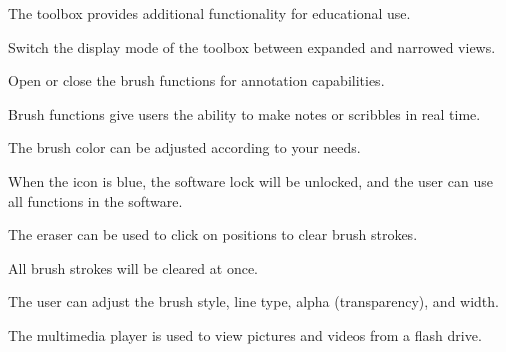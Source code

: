 \documentclass[11pt,a4paper]{article}
\begin{document}

The toolbox provides additional functionality for educational use.


Switch the display mode of the toolbox between expanded and narrowed views.


Open or close the brush functions for annotation capabilities.


Brush functions give users the ability to make notes or scribbles in real time.



The brush color can be adjusted according to your needs.


When the icon is blue, the software lock will be unlocked, and the user can
use all functions in the software.


The eraser can be used to click on positions to clear brush strokes.


All brush strokes will be cleared at once.


The user can adjust the brush style, line type, alpha (transparency), and width.


The multimedia player is used to view pictures and videos from a flash drive.

\begin{tbkSpecTable}[caption={Supported Media Formats}]
\end{tbkSpecTable}

\begin{tbkOperationTable}[caption={Multimedia Player Controls}]
\end{tbkOperationTable}
\end{document}
